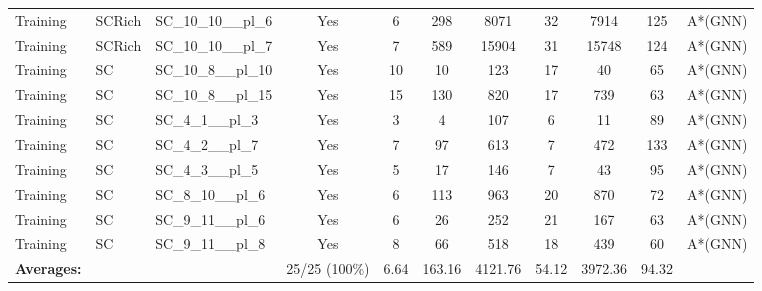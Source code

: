 \documentclass{article}
\begin{document}
\begin{tabular}{lllcccccccc}
Training & SCRich & SC\_10\_10\_\_pl\_6 & Yes & 6 & 298 & 8071 & 32 & 7914 & 125 & A*(GNN) \\
Training & SCRich & SC\_10\_10\_\_pl\_7 & Yes & 7 & 589 & 15904 & 31 & 15748 & 124 & A*(GNN) \\
Training & SC & SC\_10\_8\_\_pl\_10 & Yes & 10 & 10 & 123 & 17 & 40 & 65 & A*(GNN) \\
Training & SC & SC\_10\_8\_\_pl\_15 & Yes & 15 & 130 & 820 & 17 & 739 & 63 & A*(GNN) \\
Training & SC & SC\_4\_1\_\_pl\_3 & Yes & 3 & 4 & 107 & 6 & 11 & 89 & A*(GNN) \\
Training & SC & SC\_4\_2\_\_pl\_7 & Yes & 7 & 97 & 613 & 7 & 472 & 133 & A*(GNN) \\
Training & SC & SC\_4\_3\_\_pl\_5 & Yes & 5 & 17 & 146 & 7 & 43 & 95 & A*(GNN) \\
Training & SC & SC\_8\_10\_\_pl\_6 & Yes & 6 & 113 & 963 & 20 & 870 & 72 & A*(GNN) \\
Training & SC & SC\_9\_11\_\_pl\_6 & Yes & 6 & 26 & 252 & 21 & 167 & 63 & A*(GNN) \\
Training & SC & SC\_9\_11\_\_pl\_8 & Yes & 8 & 66 & 518 & 18 & 439 & 60 & A*(GNN) \\
\textbf{Averages:} & & & 25/25 (100\%) & 6.64 & 163.16 & 4121.76 & 54.12 & 3972.36 & 94.32 & \\
\bottomrule
\end{tabular}
\newpage
\end{document}
